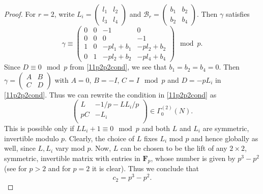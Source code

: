 \documentclass[11pt]{amsart}
\numberwithin{equation}{section}
\theoremstyle{plain}
\theoremstyle{definition}
\newcommand{\mf}{\mathbf}
\newcommand{\mc}{\mathcal}
\newcommand{\smat}[4]{\left( \begin{smallmatrix}#1&#2\\#3&#4\end{smallmatrix}\right)}
\newcommand{\pmat}[4]{\begin{pmatrix} #1 & #2 \\ #3 & #4 \\ \end{pmatrix} }
\begin{document}
\begin{proof}
For $r=2$, write $L_i=\smat{l_1}{l_2}{l_3}{l_4}$ and $\mc B_r=\smat{b_1}{b_2}{b_2}{b_4}$. Then $\gamma$ satisfies
\begin{equation}
    \gamma\equiv\left(\begin{array}{rrrr}
0 & 0 & -1 & 0 \\
0 & 0 & 0 & -1 \\
1 & 0 & -p l_{1} + b_{1} & -p l_{2} + b_{2} \\
0 & 1 & -p l_{2} + b_{2} & -p l_{4} + b_{4}
\end{array}\right) \mod p.
\end{equation}
Since $D\equiv 0 \mod p$ from \eqref{11p2p2cond}, we see that $b_1=b_2=b_4=0$. Then $\gamma=\smat{A}{B}{C}{D}$ with
$A=0$, $B=-I$, $C=I \mod p$ and $D=-pL_i$ in \eqref{11p2p2cond}. Thus we can rewrite the condition in \eqref{11p2p2cond} as
\begin{equation}
     \pmat{L}{-1/p-LL_i/p}{pC}{-L_i} \in \Gamma^{(2)}_0(N).
\end{equation}
This is possible only if $LL_i+1\equiv 0 \mod p$ and both $L$ and $L_i$ are symmetric, invertible modulo $p$. Clearly, the choice of $L$ fixes $L_i$ mod $p$ and hence globally as well, since $L,L_i$ vary mod $p$.
Now, $L$ can be chosen to be the lift of any $2\times 2$, symmetric, invertible matrix with entries in $\mf F_p$, whose number is given by $p^3-p^2$ (see \cite{carlitz1954representations} for $p>2$ and for $p=2$ it is clear). Thus we conclude that \begin{equation}
    c_2=p^3-p^2.
\end{equation}


\end{proof}
\end{document}
